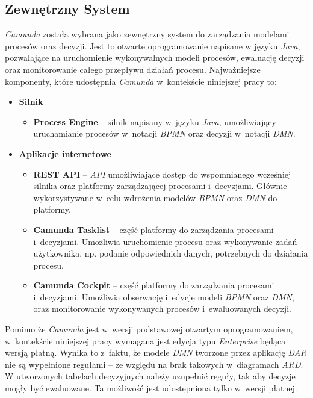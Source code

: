 \subsection{Zewnętrzny System}
\label{sec:zewnętrznySystem}
\emph{Camunda} została wybrana jako zewnętrzny system do zarządzania modelami procesów oraz decyzji. Jest to otwarte oprogramowanie napisane w języku \emph{Java}, pozwalające na uruchomienie wykonywalnych modeli procesów, ewaluację decyzji oraz monitorowanie całego przepływu działań procesu. Najważniejsze komponenty, które udostępnia \emph{Camunda} w~kontekście niniejszej pracy to:
\begin{itemize}
    \item \textbf{Silnik}
        \begin{itemize}
            \item \textbf{Process Engine} -- silnik napisany w~języku \emph{Java}, umożliwiający uruchamianie procesów w~notacji \emph{BPMN} oraz decyzji w~notacji \emph{DMN}.
        \end{itemize}
    \item \textbf{Aplikacje internetowe}
        \begin{itemize}
            \item \textbf{REST API} -- \emph{API} umożliwiające dostęp do wspomnianego wcześniej silnika oraz platformy zarządzającej procesami i~decyzjami. Głównie wykorzystywane w~celu wdrożenia modelów \emph{BPMN} oraz \emph{DMN} do platformy.
            \item \textbf{Camunda Tasklist} -- część platformy do zarządzania procesami i~decyzjami. Umożliwia uruchomienie procesu oraz wykonywanie zadań użytkownika, np. podanie odpowiednich danych, potrzebnych do działania procesu.
            \item \textbf{Camunda Cockpit} -- część platformy do zarządzania procesami i~decyzjami. Umożliwia obserwację i~edycję modeli \emph{BPMN} oraz \emph{DMN}, oraz monitorowanie wykonywanych procesów i~ewaluowanych decyzji.
        \end{itemize}
\end{itemize}

Pomimo że \emph{Camunda} jest w~wersji podstawowej otwartym oprogramowaniem, w~kontekście niniejszej pracy wymagana jest edycja typu \emph{Enterprise} będąca wersją płatną. Wynika to z~faktu, że modele \emph{DMN} tworzone przez aplikację \emph{DAR} nie są wypełnione regułami -- ze względu na brak takowych w~diagramach \emph{ARD}. W utworzonych tabelach decyzyjnych należy uzupełnić reguły, tak aby decyzje mogły być ewaluowane. Ta możliwość jest udostępniona tylko w~wersji płatnej.

